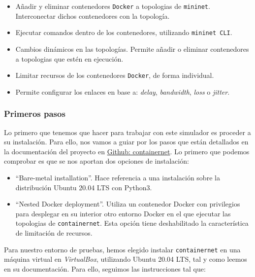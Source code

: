 \documentclass[12pt]{article}
\begin{document}
	\begin{itemize}
		\item Añadir y eliminar contenedores \texttt{Docker} a topologias de \texttt{mininet}. Interconectar dichos contenedores con la topología.
		
		\item Ejecutar comandos dentro de los contenedores, utilizando \texttt{mininet CLI}.
		
		\item Cambios dinámicos en las topologías. Permite añadir o eliminar contenedores a topologias que estén en ejecución.
		
		\item Limitar recursos de los contenedores \texttt{Docker}, de forma individual.
		
		\item Permite configurar los enlaces en base a: \textit{delay}, \textit{bandwidth}, \textit{loss} o \textit{jitter}.
	\end{itemize}
	
	\pagebreak
	
	\subsubsection{Primeros pasos}
	\noindent Lo primero que tenemos que hacer para trabajar con este simulador es proceder a su instalación. Para ello, nos vamos a guiar por los pasos que están detallados en la documentación del proyecto en \href{https://containernet.github.io/#installation}{Github: containernet}. Lo primero que podemos comprobar es que se nos aportan dos opciones de instalación:
	\begin{itemize}
		\item ``Bare-metal installation''. Hace referencia a una instalación sobre la distribución Ubuntu 20.04 LTS con Python3.
		
		\item ``Nested Docker deployment''. Utiliza un contenedor Docker con privilegios para desplegar en su interior otro entorno Docker en el que ejecutar las topologias de \texttt{containernet}. Esta opción tiene deshabilitado la característica de limitación de recursos.
	\end{itemize}

	\noindent Para nuestro entorno de pruebas, hemos elegido instalar \texttt{containernet} en una máquina virtual en \textit{VirtualBox}, utilizando Ubuntu 20.04 LTS, tal y como leemos en su documentación. Para ello, seguimos las instrucciones tal que:
	
\end{document}
